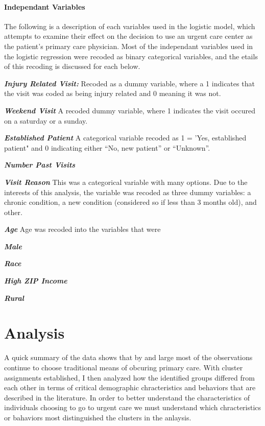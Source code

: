 \documentclass[12pt,twoside]{reedthesis}
\begin{document}
  \subsubsection*{Independant Variables}\label{independant-variables}
  
  The following is a description of each variables used in the logistic
  model, which attempts to examine their effect on the decision to use an
  urgent care center as the patient's primary care physician. Most of the
  independant variables used in the logistic regression were recoded as
  binary categorical variables, and the etails of this recoding is
  discussed for each below.
  
  \textbf{\emph{Injury Related Visit:}} Recoded as a dummy variable, where
  a 1 indicates that the visit was coded as being injury related and 0
  meaning it was not.
  
  \textbf{\emph{Weekend Visit}} A recoded dummy variable, where 1
  indicates the visit occured on a saturday or a sunday.
  
  \textbf{\emph{Established Patient}} A categorical variable recoded as 1
  = 'Yes, established patient" and 0 indicating either ``No, new patient''
  or ``Unknown''.
  
  \textbf{\emph{Number Past Visits}}
  
  \textbf{\emph{Visit Reason}} This was a categorical variable with many
  options. Due to the interests of this analysis, the variable was recoded
  as three dummy variables: a chronic condition, a new condition
  (considered so if less than 3 months old), and other.
  
  \textbf{\emph{Age}} Age was recoded into the variables that were
  
  \textbf{\emph{Male}}
  
  \textbf{\emph{Race}}
  
  \textbf{\emph{High ZIP Income}}
  
  \textbf{\emph{Rural}}
  
  \chapter*{Analysis}\label{analysis}
  
  \onehalfspacing
  
  A quick summary of the data shows that by and large most of the
  observations continue to choose traditional means of obcuring primary
  care. With cluster assignments established, I then analyzed how the
  identified groups differed from each other in terms of critical
  demographic chracteristics and behaviors that are described in the
  literature. In order to better understand the characteristics of
  individuals choosing to go to urgent care we must understand which
  chracteristics or bahaviors most distinguished the clusters in the
  anlaysis.
  
\end{document}
